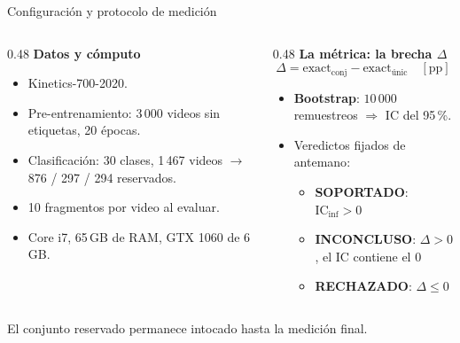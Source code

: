 \documentclass[aspectratio=169,10pt]{beamer}
\begin{document}
\begin{frame}{Configuración y protocolo de medición}
  \small
  \begin{columns}[T, onlytextwidth]
    \begin{column}{0.48\textwidth}
      \textbf{Datos y cómputo}
      \begin{itemize}
        \item Kinetics-700-2020.
        \item Pre-entrenamiento: \alert{3\,000 videos sin etiquetas},
              20 épocas.
        \item Clasificación: \alert{30 clases}, 1\,467 videos
              $\rightarrow$ 876 / 297 / \alert{294 reservados}.
        \item 10 fragmentos por video al evaluar.
        \item Core i7, 65\,GB de RAM, GTX 1060 de 6\,GB.
      \end{itemize}
    \end{column}
    \begin{column}{0.48\textwidth}
      \textbf{La métrica: la brecha $\Delta$}
      \[
        \Delta = \text{exact}_{\text{conj}} - \text{exact}_{\text{únic}}
        \quad [\text{pp}]
      \]
      \begin{itemize}
        \item \textbf{Bootstrap}: $10\,000$ remuestreos $\Rightarrow$
              IC del 95\,\%.
        \item Veredictos fijados \alert{de antemano}:
          \begin{itemize}
            \item \textbf{SOPORTADO}: $\text{IC}_{\text{inf}} > 0$
            \item \textbf{INCONCLUSO}: $\Delta > 0$, el IC contiene el 0
            \item \textbf{RECHAZADO}: $\Delta \leq 0$
          \end{itemize}
      \end{itemize}
    \end{column}
  \end{columns}

  \vfill
  \centering
  El conjunto reservado permanece \alert{intocado} hasta la medición final.
\end{frame}
\end{document}
